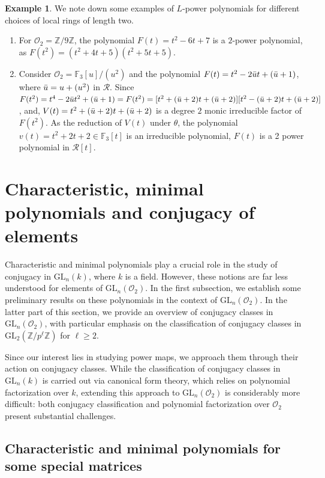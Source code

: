 \documentclass[11pt,twoside]{amsart}
\newcommand{\GL}{\mathrm{GL}}
\newcommand{\Z}{\mathbb{Z}}
\newcommand{\R}{\mathscr{O}_2}
\theoremstyle{definition} %
\newtheorem{example}[lemma]{Example}
\begin{document}
\begin{example}\label{ex:L-power-polynomial}
We note down some examples of $L$-power polynomials for different choices of local rings of length two. 
\begin{enumerate}
\item For $\R=\Z/9\Z$, the polynomial $F(t)=t^2 - 6t + 7 $ is a $2$-power polynomial, as $F(t^2)=(t^2 + 4t + 5)  (t^2 + 5t + 5)$.
\item Consider $\R=\mathbb{F}_3[u]/(u^2)$ and the polynomial $F(t)=t^2-2\Bar{u}t+(\Bar{u}+1)$, where $\Bar{u}=u+(u^2)$ in $\mathscr R$. 
Since $F(t^2)=t^4-2\Bar{u}t^2+(\Bar{u}+1)=F(t^2)=[t^2+(\Bar{u}+2)t+(\Bar{u}+2)][t^2-(\Bar{u}+2)t+(\Bar{u}+2)]$, and, $V(t)=t^2+(\Bar{u}+2)t+(\Bar{u}+2)$ is a degree $2$ monic irreducible factor of $F(t^2)$. 
As the reduction of $V(t)$ under $\theta$, the polynomial $v(t)=t^2+2t+2\in \mathbb{F}_3[t]$ is an irreducible polynomial, $F(t)$ is a 2 power polynomial in $\mathscr R[t]$.
\end{enumerate}
\end{example}
\section{Characteristic, minimal polynomials and conjugacy of elements}\label{sec:prep}
Characteristic and minimal polynomials play a crucial role in the study of conjugacy in $\GL_n(k)$, where $k$ is a field.  
However, these notions are far less understood for elements of $\GL_n(\R)$.  
In the first subsection, we establish some preliminary results on these polynomials in the context of $\GL_n(\R)$.  
In the latter part of this section, we provide an overview of conjugacy classes in $\GL_n(\R)$, with particular emphasis on the classification of conjugacy classes in $\GL_2(\mathbb{Z}/p^\ell\mathbb{Z})$ for $\ell \geq 2$.  

Since our interest lies in studying power maps, we approach them through their action on conjugacy classes.  
While the classification of conjugacy classes in $\GL_n(k)$ is carried out via canonical form theory, which relies on polynomial factorization over $k$, extending this approach to $\GL_n(\R)$ is considerably more difficult: both conjugacy classification and polynomial factorization over $\R$ present substantial challenges.
\subsection{Characteristic and minimal polynomials for some special matrices}\label{subsec-min-char}
\end{document}
